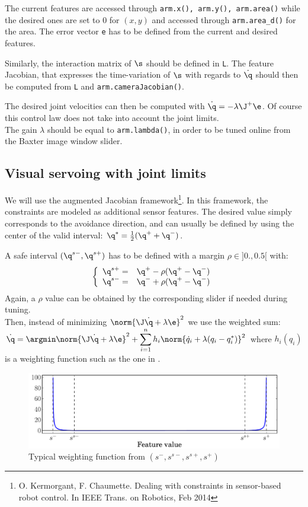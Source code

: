 \documentclass{ecnreport}
\begin{document}
The current features are accessed through \texttt{arm.x(), arm.y(), arm.area()} while the desired ones are set to 0 for $(x,y)$ and accessed through \texttt{arm.area\_d()} for the area. 
The error vector \texttt{e} has to be defined from the current and desired features.

Similarly, the interaction matrix of $\s$ should be defined in \texttt{L}. The feature Jacobian, that expresses the time-variation of $\s$ with regards to $\dot \q$ should then be computed
from \texttt{L} and \texttt{arm.cameraJacobian()}.

The desired joint velocities can then be computed with $\dot \q = -\lambda\J^+\e$. Of course this control law does not take into account the joint limits. \\The gain $\lambda$ should be equal to \texttt{arm.lambda()}, in order to be tuned online from the Baxter image window slider.

\subsection{Visual servoing with joint limits}

We will use the augmented Jacobian framework\footnote{O. Kermorgant, F. Chaumette. Dealing with constraints in sensor-based robot control. In IEEE Trans. on Robotics, Feb 2014}.
In this framework, the constraints are modeled as additional sensor features. The desired value simply corresponds to the avoidance direction, and can usually be defined by using the center of the valid interval: $\q^* = \frac{1}{2}(\q^+ + \q^-)$.

A safe interval $(\q^{s-}, \q^{s+})$ has to be defined with a margin $\rho\in]0.,0.5[$ with:
\begin{equation*}
\left\{\begin{array}{ll}
	\q^{s+} = & \q^{+} - \rho(\q^+ - \q^-) \\
	\q^{s-} = & \q^{-} + \rho(\q^+ - \q^-)
\end{array}\right.
\end{equation*}Again, a $\rho$ value can be obtained by the corresponding slider if needed during tuning.\\

Then, instead of minimizing $\norm{\J\dot \q + \lambda\e}^2$ we use the weighted sum:\\ $\displaystyle \dot \q = \argmin \norm{\J\dot \q + \lambda\e}^2 + \sum_{i=1}^n h_i\norm{\dot q_i + \lambda(q_i - q_i^*)}^2$ where $h_i(q_i)$ is a weighting function such as the one in .
\begin{figure}\centering
	\includegraphics[width=.7\linewidth]{constraint_0inf}
	\caption{Typical weighting function from $(s^-, s^{s-}, s^{s+}, s^+)$}
	\label{weight}		
\end{figure}
\end{document}
